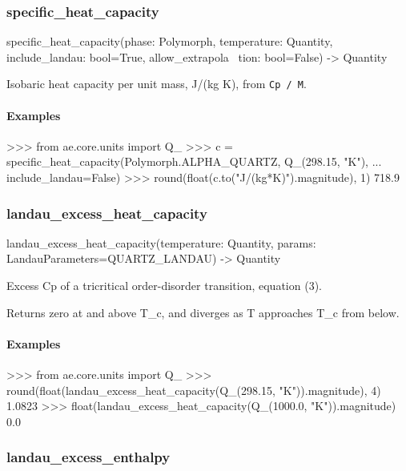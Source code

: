 \documentclass[10pt,a4paper,twoside]{report}
\begin{document}
\subsubsection*{specific\_heat\_capacity}

\begin{verbatimsmall}
specific_heat_capacity(phase: Polymorph, temperature: Quantity, include_landau: bool=True, allow_extrapola
    \ tion: bool=False) -> Quantity
\end{verbatimsmall}

Isobaric heat capacity per unit mass, J/(kg K), from \texttt{Cp / M}.

\paragraph*{Examples}

\begin{doctestblock}
>>> from ae.core.units import Q_
>>> c = specific_heat_capacity(Polymorph.ALPHA_QUARTZ, Q_(298.15, "K"),
...                            include_landau=False)
>>> round(float(c.to("J/(kg*K)").magnitude), 1)
718.9
\end{doctestblock}

\subsubsection*{landau\_excess\_heat\_capacity}

\begin{verbatimsmall}
landau_excess_heat_capacity(temperature: Quantity, params: LandauParameters=QUARTZ_LANDAU) -> Quantity
\end{verbatimsmall}

Excess Cp of a tricritical order-disorder transition, equation (3).

Returns zero at and above T\_c, and diverges as T approaches T\_c from below.

\paragraph*{Examples}

\begin{doctestblock}
>>> from ae.core.units import Q_
>>> round(float(landau_excess_heat_capacity(Q_(298.15, "K")).magnitude), 4)
1.0823
>>> float(landau_excess_heat_capacity(Q_(1000.0, "K")).magnitude)
0.0
\end{doctestblock}

\subsubsection*{landau\_excess\_enthalpy}
\end{document}
